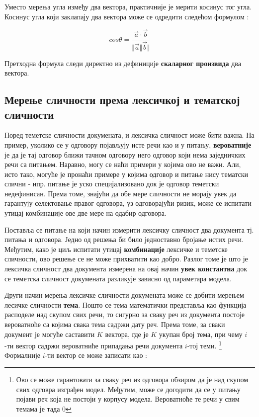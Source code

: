 Уместо мерења угла између два вектора, практичније је мерити косинус тог угла. 
Косинус угла који заклапају два вектора може се одредити следећом формулом :


$$ cos\theta = \frac{\overrightarrow{a}\cdot \overrightarrow{b}}{\Vert\overrightarrow{a}\Vert\overrightarrow{b}\Vert} $$


Претходна формула следи директно из дефиниције \textbf{скаларног произвида} два вектора.



\subsection{Мерење сличности према лексичкој и тематској сличности}

Поред теметске сличности докумената, и лексичка сличност може бити важна. На пример, уколико се у одговору појављују исте речи као и у питању, \textbf{вероватније} је да је тај одговор ближи тачном одговору  него одговор који нема заједничких речи са питањем. Наравно, могу се наћи примери у којима ово не важи. Али, исто тако, могуће је пронаћи примере у којима одговор и питање нису тематски слични - нпр. питање је уско специјализовано док је одговор теметски недефинисан. Према томе, знајући да обе мере сличности не морају увек да гарантују селектовање правог одговора, уз одговорајући ризик, може се испитати утицај комбинације ове две мере на одабир  одговора. 

Поставља се питање на који начин измерити лексичку сличност два документа тј. питања и одговора. Једно од решења би било једноставно бројање истих речи. Међутим, како је циљ испитати утицај \textbf{комбинације} лексичке и теметске сличности, ово решење се не може прихватити као добро. Разлог томе је што је лексичка сличност два документа измерена на овај начин \textbf{увек константна} док се теметска сличност докумената разликује зависно од параметара модела. 	

Други начин мерења лексичке сличности докумената може се добити мерењем лесичке сличности \textbf{тема}.
Пошто се тема математички представља као функција расподеле над скупом свих речи, то сигурно за сваку реч из документа постоје вероватноће са којима свака тема садржи дату реч. Према томе, за сваки документ је могуће саставити $K$ вектора, где је $K$ укупан број тема, при чему $i$-ти вектор садржи вероватниће припадања речи документа  $i$-тој теми. \footnote{Ово се може гарантовати за сваку реч из одговора обзиром да је над скупом свих одговра изграђен модел. Међутим, може се догодити да се у питању појави реч која не постоји у корпусу модела. Вероватноће те речи у свим темама је тада 0} Формалније $i$-ти вектор се може записати као :

